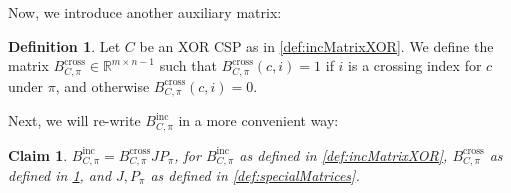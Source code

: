 \documentclass[11pt]{article}
\newtheorem{claim}[theorem]{Claim}
\theoremstyle{definition}
\newtheorem{definition}{Definition}[section]
\newcommand{\R}{\mathbb{R}}
\begin{document}
Now, we introduce another auxiliary matrix:

\begin{definition}\label{def:crossMatrixXOR}
    Let $C$ be an XOR CSP as in \cref{def:incMatrixXOR}. We define the matrix $B^{\text{cross}}_{C, \pi} \in \R^{m \times n-1}$ such that $B^{\text{cross}}_{C, \pi}(c, i) = 1$ if $i$ is a crossing index for $c$ under $\pi$, and otherwise $B^{\text{cross}}_{C, \pi}(c, i) = 0$.
\end{definition}

Next, we will re-write $B^{\text{inc}}_{C, \pi}$ in a more convenient way:

\begin{claim}\label{clm:convenientRep}
	$B^{\text{inc}}_{C, \pi} = B^{\text{cross}}_{C, \pi} J P_{\pi}$, for $B^{\text{inc}}_{C, \pi}$ as defined in \cref{def:incMatrixXOR}, $B^{\text{cross}}_{C, \pi}$ as defined in \cref{def:crossMatrixXOR}, and $J, P_{\pi}$ as defined in  \cref{def:specialMatrices}.
\end{claim}
\end{document}
